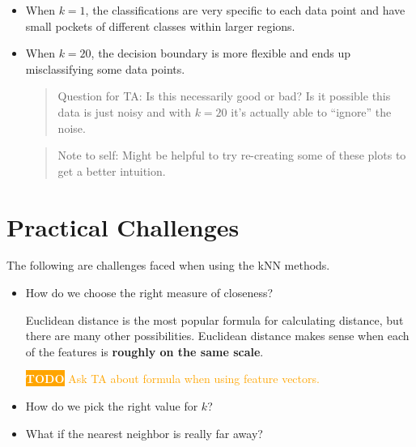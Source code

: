\documentclass{report}
\newcommand{\todotext}[1]{\colorbox{orange}{\textcolor{white}{\textbf{TODO}}}}
\newcommand{\todo}[1]{\textsf{\todotext{} \textcolor{orange}{#1}}}
\begin{document}
  \begin{itemize}
    \item When \(k = 1\), the classifications are very specific to each data point
    and have small pockets of different classes within larger regions. 
    \item When \(k = 20\), the decision boundary is more flexible and ends up misclassifying
    some data points.
    \begin{quote}
      Question for TA: Is this necessarily good or bad? Is it possible this data
      is just noisy and with \(k = 20\) it's actually able to ``ignore'' the noise.
    \end{quote}
    \begin{quote}
      Note to self: Might be helpful to try re-creating some of these plots to get a
      better intuition.
    \end{quote}
  \end{itemize}

\section{Practical Challenges}
The following are challenges faced when using the kNN methods.
\begin{itemize}
  \item How do we choose the right measure of closeness?
  
  Euclidean distance is the most popular formula for calculating distance, but
  there are many other possibilities. Euclidean distance makes sense
  when each of the features is \textbf{roughly on the same scale}.

  \todo{Ask TA about formula when using feature vectors.}

  \item How do we pick the right value for \(k\)?
  \item What if the nearest neighbor is really far away?
\end{itemize}
\end{document}
